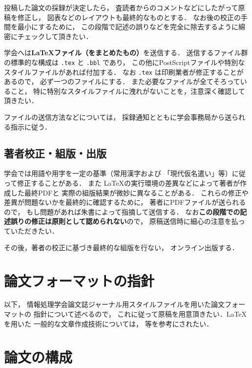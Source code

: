 \documentclass[submit]{ipsj-lualatex}
\def\|{\verb|}
\begin{document}
投稿した論文の採録が決定したら，
査読者からのコメントなどにしたがって原稿を修正し，
図表などのレイアウトも最終的なものとする．
なお後の校正の手間を最小にするために，
この段階で記述の誤りなどを完全に除去するように綿密にチェックして頂きたい．



学会へは{\bf \LaTeX ファイル（をまとめたもの）}を送信する．
送信するファイル群の標準的な構成は \|.tex| と \|.bbl| であり，
この他にPostScriptファイルや特別なスタイルファイルがあれば付加する．
なお \|.tex| は印刷業者が修正することがあるので，
{必ず一つのファイルにする}．
また必要なファイルが全てそろっていること，
特に特別なスタイルファイルに洩れがないことを，注意深く確認して頂きたい．


ファイルの送信方法などについては，
採録通知とともに学会事務局から送られる指示に従う．




\subsection{著者校正・組版・出版}


学会では用語や用字を一定の基準（常用漢字および
「現代仮名遣い」等）に従って修正することがある．
また \LaTeX の実行環境の差異などによって著者が作成した最終PDFと
実際の組版結果が微妙に異なることがある．
これらの修正や差異が問題ないかを最終的に確認するために，
著者にPDFファイルが送られるので，
もし問題があれば朱書によって指摘して送信する．
なお{\bf この段階での記述誤りの修正は原則として認められない}ので，
原稿送信時に細心の注意を払っていただきたい．


その後，著者の校正に基づき最終的な組版を行ない，
オンライン出版する．




\section{論文フォーマットの指針}
\label{sec:format}

以下，
情報処理学会論文誌ジャーナル用スタイルファイルを用いた論文フォーマットの
指針について述べるので，
これに従って原稿を用意頂きたい．\LaTeX を用いた
一般的な文章作成技術については，\cite{okumura, companion} 等を参考にされたい．



\section{論文の構成}
\label{config}
\end{document}
